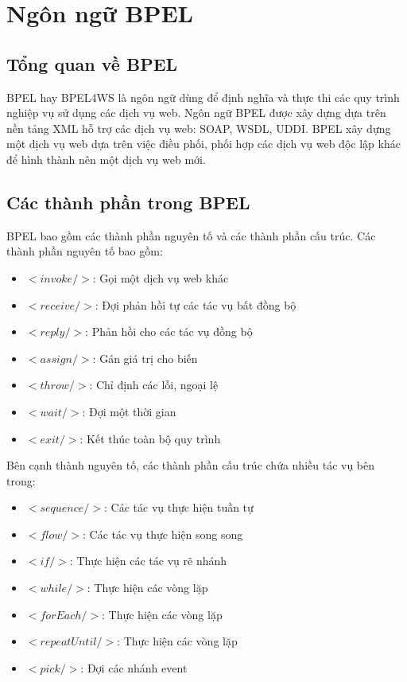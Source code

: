 \section{Ngôn ngữ BPEL}
\subsection{Tổng quan về BPEL}
\hspace*{0.5cm} BPEL hay BPEL4WS là ngôn ngữ dùng để định nghĩa và thực thi các quy trình nghiệp vụ sử dụng các dịch vụ web. Ngôn ngữ BPEL được xây dựng dựa trên nền tảng XML hỗ trợ các dịch vụ web: SOAP, WSDL, UDDI. BPEL xây dựng một dịch vụ web dựa trên việc điều phối, phối hợp các dịch vụ web độc lập khác để hình thành nên một dịch vụ web mới.
\subsection{Các thành phần trong BPEL}
\hspace*{0.5cm}BPEL bao gồm các thành phần nguyên tố và các thành phần cấu trúc. Các thành phần nguyên tố bao gồm:
\begin{itemize}
    \item $<invoke/>$: Gọi một dịch vụ web khác
    \item $<receive/>$: Đợi phản hồi tự các tác vụ bất đồng bộ
    \item $<reply/>$: Phản hồi cho các tác vụ đồng bộ
    \item $<assign/>$: Gán giá trị cho biến
    \item $<throw/>$: Chỉ định các lỗi, ngoại lệ
    \item $<wait/>$: Đợi một thời gian
    \item $<exit/>$: Kết thúc toàn bộ quy trình
\end{itemize}

Bên cạnh thành nguyên tố, các thành phần cấu trúc chứa nhiều tác vụ bên trong:
\begin{itemize}
    \item $<sequence/>$: Các tác vụ thực hiện tuần tự
    \item $<flow/>$: Các tác vụ thực hiện song song
    \item $<if/>$: Thực hiện các tác vụ rẽ nhánh
    \item $<while/>$: Thực hiện các vòng lặp
    \item $<forEach/>$: Thực hiện các vòng lặp
    \item $<repeatUntil/>$: Thực hiện các vòng lặp
    \item $<pick/>$: Đợi các nhánh event
\end{itemize}

